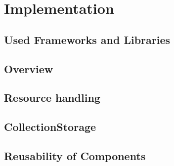 \documentclass[12pt,a4paper,twoside]{scrartcl}		%
\begin{document}


\section{Implementation}
\label{sec:implementation}

\subsection{Used Frameworks and Libraries}
\label{sec:used-fram-libr}


\subsection{Overview}
\label{sec:overview}

\subsection{Resource handling}
\label{sec:resource-handling}



\subsection{CollectionStorage}
\label{sec:collectionstorage}


\subsection{Reusability of Components}
\label{sec:reus-comp}
\end{document}

